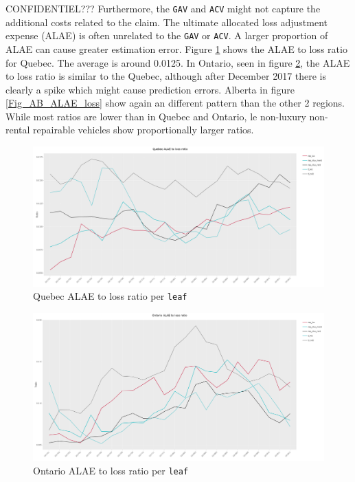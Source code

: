 	CONFIDENTIEL???
	Furthermore, the \texttt{GAV} and \texttt{ACV} might not capture the additional costs related to the claim. The ultimate allocated loss adjustment expense (ALAE) is often unrelated to the \texttt{GAV} or \texttt{ACV}. A larger proportion of ALAE can cause greater estimation error. Figure \ref{Fig_QC_ALAE_loss} shows the ALAE to loss ratio for Quebec. The average is around 0.0125. In Ontario, seen in figure \ref{Fig_ON_ALAE_loss}, the ALAE to loss ratio is similar to the Quebec, although after December 2017 there is clearly a spike which might cause prediction errors. Alberta in figure \ref{Fig_AB_ALAE_loss} show again an different pattern than the other 2 regions. While most ratios are lower than in Quebec and Ontario, le non-luxury  non-rental repairable vehicles show proportionally larger ratios. 
	
	\begin{figure}[H]
		\begin{center}
			\includegraphics[scale=0.2]{Graphiques/QC_ALAE_loss} 
			\renewcommand{\figurename}{Figure}
			\caption{Quebec ALAE to loss ratio per \texttt{leaf}}\label{Fig_QC_ALAE_loss}
		\end{center}
	\end{figure}

	\begin{figure}[H]
		\begin{center}
				\includegraphics[scale=0.2]{Graphiques/ON_ALAE_loss} 
			\renewcommand{\figurename}{Figure}
			\caption{Ontario ALAE to loss ratio per \texttt{leaf}}\label{Fig_ON_ALAE_loss}
		\end{center}
	\end{figure}
	
